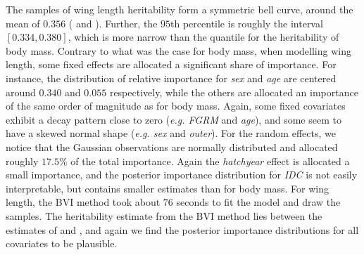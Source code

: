\noindent The samples of wing length heritability form a symmetric bell curve, around the mean of $0.356$ ( and ). Further, the $95$th percentile is roughly the interval $[0.334, 0.380]$, which is more narrow than the quantile for the heritability of body mass. Contrary to what was the case for body mass, when modelling wing length, some fixed effects are allocated a significant share of importance. For instance, the distribution of relative importance for \textit{sex} and \textit{age} are centered around $0.340$ and $0.055$ respectively, while the others are allocated an importance of the same order of magnitude as for body mass. Again, some fixed covariates exhibit a decay pattern close to zero (\textit{e.g. FGRM} and \textit{age}), and some seem to have a skewed normal shape (\textit{e.g. sex} and \textit{outer}). For the random effects, we notice that the Gaussian observations are normally distributed and allocated roughly $17.5\%$ of the total importance. Again the \textit{hatchyear} effect is allocated a small importance, and the posterior importance distribution for \textit{IDC} is not easily interpretable, but contains smaller estimates than for body mass. For wing length, the BVI method took about $76$ seconds to fit the model and draw the samples. The heritability estimate from the BVI method lies between the estimates of \citet{Silva2017} and \citet{Muff2019Genetic}, and again we find the posterior importance distributions for all covariates to be plausible.
